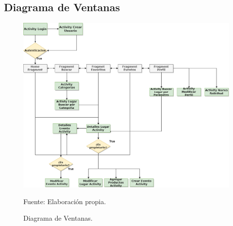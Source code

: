\documentclass[12pt,letterpaper,openany]{book}
\begin{document}
\subsection{Diagrama de Ventanas}
\begin{figure}[H]
\begin{center}
\includegraphics[width=17cm]{./imagenes/diagrama_ventanas}
\caption{Diagrama de Ventanas.}
\centering Fuente: Elaboración propia.
\end{center}
\end{figure}
\end{document}
